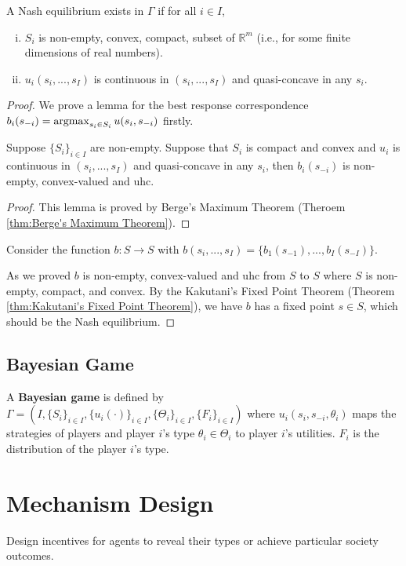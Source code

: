 \documentclass[11pt]{elegantbook}
\newcommand{\argmax}{\operatornamewithlimits{argmax}}
\begin{document}
\begin{theorem}
    A Nash equilibrium exists in $\Gamma$ if for all $i\in I$,
    \begin{enumerate}[(i).]
        \item $S_i$ is non-empty, convex, compact, subset of $\mathbb{R}^m$ (i.e., for some finite dimensions of real numbers).
        \item $u_i(s_i,...,s_I)$ is continuous in $(s_i,...,s_I)$ and quasi-concave in any $s_i$.
    \end{enumerate}
\end{theorem}
\begin{proof}
    We prove a lemma for the best response correspondence $b_i(s_{-i})=\argmax_{s_i\in S_i}u(s_i,s_{-i})$ firstly.
    \begin{lemma}
        Suppose $\{S_i\}_{i\in I}$ are non-empty. Suppose that $S_i$ is compact and convex and $u_i$ is continuous in $(s_i,...,s_I)$ and quasi-concave in any $s_i$, then $b_i(s_{-i})$ is non-empty, convex-valued and uhc.
    \end{lemma}
    \begin{proof}
        This lemma is proved by Berge's Maximum Theorem (Theroem \ref{thm:Berge's Maximum Theorem}).
    \end{proof}
    Consider the function $b: S \rightarrow S$ with $b(s_i,...,s_I)=\{b_1(s_{-1}),...,b_I(s_{-I})\}$.

    As we proved $b$ is non-empty, convex-valued and uhc from $S$ to $S$ where $S$ is non-empty, compact, and convex. By the Kakutani's Fixed Point Theorem (Theorem \ref{thm:Kakutani's Fixed Point Theorem}), we have $b$ has a fixed point $s\in S$, which should be the Nash equilibrium.
\end{proof}

\subsection{Bayesian Game}
\begin{definition}
    \normalfont
    A \textbf{Bayesian game} is defined by $\Gamma=(I, \{S_i\}_{i\in I}, \{u_i(\cdot)\}_{i\in I},\{\Theta_i\}_{i\in I}, \{F_i\}_{i\in I})$
    where $u_i(s_i,s_{-i},\theta_i)$ maps the strategies of players and player $i$'s type $\theta_i\in \Theta_i$ to player $i$'s utilities. $F_i$ is the distribution of the player $i$'s type.
\end{definition}


\section{Mechanism Design}
Design incentives for agents to reveal their types or achieve particular society outcomes.
\end{document}
